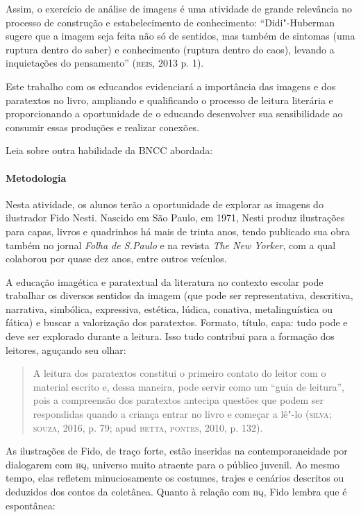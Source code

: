 \documentclass[11pt]{extarticle}
\begin{document}
Assim, o exercício de análise de imagens é uma atividade de grande
relevância no processo de construção e estabelecimento de conhecimento:
``Didi"-Huberman sugere que a imagem seja feita não só de sentidos, mas
também de sintomas (uma ruptura dentro do saber) e conhecimento (ruptura
dentro do caos), levando a inquietações do pensamento'' (\textsc{reis}, 2013 p. 1).

Este trabalho com os educandos evidenciará a importância das imagens e
dos paratextos no livro, ampliando e qualificando o processo de leitura
literária e proporcionando a oportunidade de o educando desenvolver sua
sensibilidade ao consumir essas produções e realizar conexões.

Leia sobre outra habilidade da BNCC abordada:

\paragraph{Metodologia}
Nesta atividade, os alunos terão a oportunidade de explorar as imagens
do ilustrador Fido Nesti. Nascido em São Paulo, em 1971, Nesti produz
ilustrações para capas, livros e quadrinhos há mais de trinta anos,
tendo publicado sua obra também no jornal \emph{Folha de S.Paulo} e na
revista \emph{The New Yorker}, com a qual colaborou por quase dez anos,
entre outros veículos.

A educação imagética e paratextual da literatura no contexto escolar
pode trabalhar os diversos sentidos da imagem (que pode ser
representativa, descritiva, narrativa, simbólica, expressiva, estética,
lúdica, conativa, metalinguística ou fática) e buscar a valorização dos
paratextos. Formato, título, capa: tudo pode e deve ser explorado
durante a leitura. Isso tudo contribui para a formação dos leitores,
aguçando seu olhar:

\begin{quote}
A leitura dos paratextos constitui o primeiro contato do leitor com o
material escrito e, dessa maneira, pode servir como um ``guia de
leitura'', pois a compreensão dos paratextos antecipa questões que podem
ser respondidas quando a criança entrar no livro e começar a lê"-lo
(\textsc{silva}; \textsc{souza}, 2016, p. 79; apud \textsc{betta}, \textsc{pontes}, 2010, p. 132).
\end{quote}

As ilustrações de Fido, de traço forte, estão inseridas na
contemporaneidade por dialogarem com \textsc{hq}, universo muito atraente para o
público juvenil. Ao mesmo tempo, elas refletem minuciosamente os
costumes, trajes e cenários descritos ou deduzidos dos contos da
coletânea. Quanto à relação com \textsc{hq}, Fido lembra que é espontânea:
\end{document}
